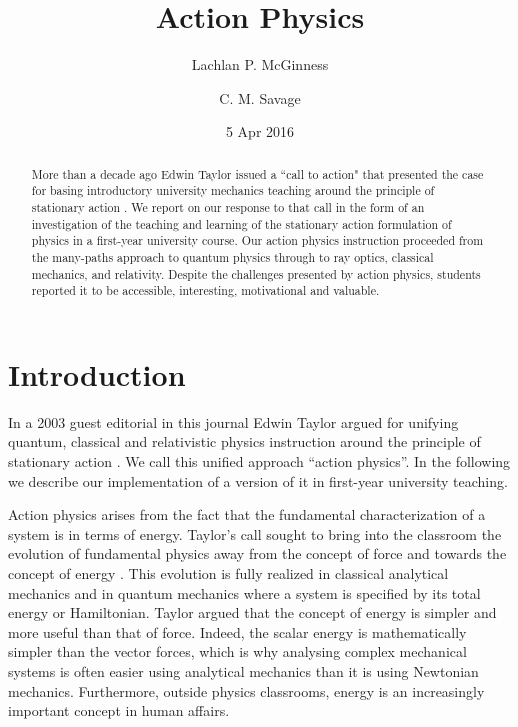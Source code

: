 \documentclass[prb,oncolumn,12pt]{revtex4-2}
\begin{document}
\title{Action Physics}

\author{Lachlan P. McGinness}
\author{C. M. Savage}

\date{5 Apr 2016 }


\begin{abstract}
\medskip
\medskip
More than a decade ago Edwin Taylor issued a ``call to action" that presented the case for basing introductory university mechanics teaching around the principle of stationary action  \cite{Taylor2003}. We report on our response to that call in the form of an investigation of the teaching and learning of the stationary action formulation of physics in a first-year university course.  Our action physics instruction proceeded from the many-paths approach to quantum physics through to ray optics, classical mechanics, and relativity. Despite the challenges presented by action physics, students reported it to be accessible, interesting, motivational and valuable. 
\end{abstract}

\maketitle
\newpage

\section{Introduction}
\label{Introduction}
In a 2003 guest editorial in this journal Edwin Taylor argued for unifying quantum, classical and relativistic physics instruction around the principle of stationary action  \cite{Taylor2003}. We call this unified approach ``action physics''. In the following we describe our implementation of a version of it in first-year university teaching.

Action physics arises from the fact that the fundamental characterization of a system is in terms of energy. Taylor's call sought to bring into the classroom the evolution of fundamental physics away from the concept of force and towards the concept of energy  \cite{Jammer,Lanczos}.  This evolution is fully realized in classical analytical mechanics and in quantum mechanics where a system is specified by its total energy or Hamiltonian. Taylor argued that the concept of energy is simpler and more useful than that of force. Indeed, the scalar energy is mathematically simpler than the vector forces, which is why analysing complex mechanical systems is often easier using analytical mechanics than it is using Newtonian mechanics. Furthermore, outside physics classrooms, energy is an increasingly important concept in human affairs.
\end{document}
